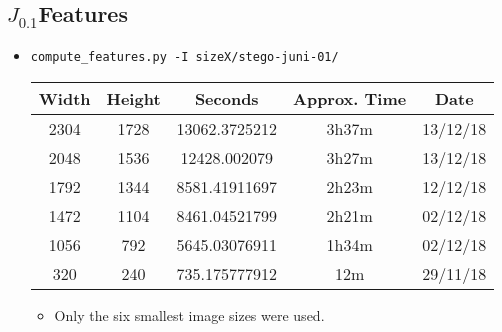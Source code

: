 \documentclass[11pt,a4paper]{report}
\newcommand{\Jtern}{\texorpdfstring{$J_{0.1}$}{J(0.1)}}
\begin{document}
\subsection{\Jtern Features}
\begin{itemize}
\item \texttt{compute\_features.py -I sizeX/stego-juni-01/}
  \begin{center}
  \begin{tabular}{ c c | c c c }
  Width & Height & Seconds & Approx. Time & Date \\ \hline
  2304 & 1728 & 13062.3725212 & 3h37m & 13/12/18 \\
  2048 & 1536 & 12428.002079 & 3h27m & 13/12/18 \\
  1792 & 1344 & 8581.41911697 & 2h23m & 12/12/18 \\
  1472 & 1104 & 8461.04521799 & 2h21m & 02/12/18 \\
  1056 & 792 & 5645.03076911 & 1h34m & 02/12/18 \\
  320 & 240 & 735.175777912 & 12m & 29/11/18 \\
  \end{tabular}
  \end{center}
  \begin{itemize}
  \item Only the six smallest image sizes were used.
  \end{itemize}
\end{itemize}
\end{document}
